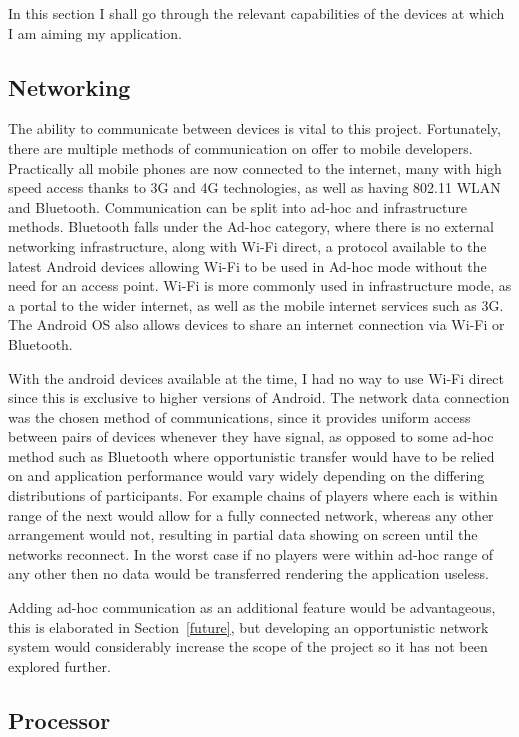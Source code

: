 In this section I shall go through the relevant capabilities of the devices at which I am aiming my application.

\subsection{Networking}

The ability to communicate between devices is vital to this project. Fortunately, there are multiple methods of communication on offer to mobile developers.
Practically all mobile phones are now connected to the internet, many with high speed access thanks to 3G and 4G technologies, as well as having 802.11 WLAN and Bluetooth.
Communication can be split into ad-hoc and infrastructure methods.
Bluetooth falls under the Ad-hoc category, where there is no external networking infrastructure, along with Wi-Fi direct, a protocol available to the latest Android devices allowing Wi-Fi to be used in Ad-hoc mode without the need for an access point.\cite{Wi-FiDirect}
Wi-Fi is more commonly used in infrastructure mode, as a portal to the wider internet, as well as the mobile internet services such as 3G.
The Android OS also allows devices to share an internet connection via Wi-Fi or Bluetooth.\cite{android22}

With the android devices available at the time, I had no way to use Wi-Fi direct since this is exclusive to higher versions of Android. The network data connection was the chosen method of communications, since it provides uniform access between pairs of devices whenever they have signal, as opposed to some ad-hoc method such as Bluetooth where opportunistic transfer would have to be relied on and application performance would vary widely depending on the differing distributions of participants. For example chains of players where each is within range of the next would allow for a fully connected network, whereas any other arrangement would not, resulting in partial data showing on screen until the networks reconnect. In the worst case if no players were within ad-hoc range of any other then no data would be transferred rendering the application useless.

Adding ad-hoc communication as an additional feature would be advantageous, this is elaborated in Section~\ref{future}, but developing an opportunistic network system would considerably increase the scope of the project so it has not been explored further.

\subsection{Processor}

